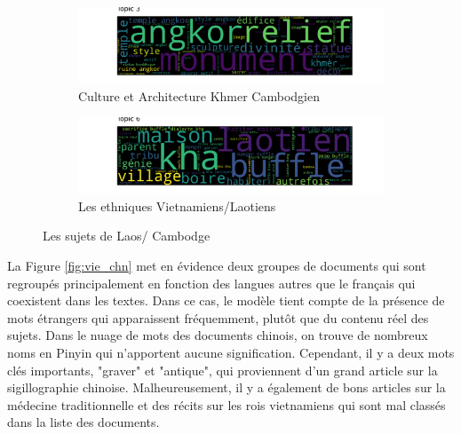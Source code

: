 \begin{figure}[ht]
     \centering
     \begin{subfigure}[b]{0.9\textwidth}
         \centering
         \includegraphics[width=\textwidth]{img/wordcloud model ngram 200 topic 3 .png}
         \caption{Culture et Architecture Khmer Cambodgien}
         \label{fig:tp12_3}
     \end{subfigure}
     \hfill
     \begin{subfigure}[b]{0.9\textwidth}
         \centering
         \includegraphics[width=\textwidth]{img/wordcloud model ngram 200 topic 6 .png}
         \caption{Les ethniques Vietnamiens/Laotiens}
         \label{fig:tp12_6}
     \end{subfigure}
     \hfill
        \caption{Les sujets de Laos/ Cambodge}
        \label{fig:lao_cam}
\end{figure}

La Figure \ref{fig:vie_chn} met en évidence deux groupes de documents qui sont regroupés principalement en fonction des langues autres que le français qui coexistent dans les textes. Dans ce cas, le modèle tient compte de la présence de mots étrangers qui apparaissent fréquemment, plutôt que du contenu réel des sujets. Dans le nuage de mots des documents chinois, on trouve de nombreux noms en Pinyin qui n'apportent aucune signification. Cependant, il y a deux mots clés importants, "graver" et "antique", qui proviennent d'un grand article sur la sigillographie chinoise. Malheureusement, il y a également de bons articles sur la médecine traditionnelle et des récits sur les rois vietnamiens qui sont mal classés dans la liste des documents.

